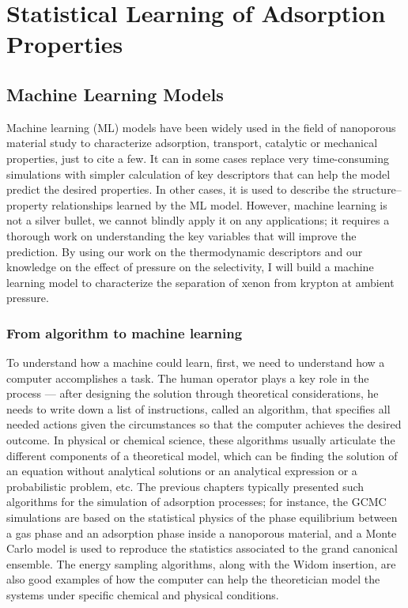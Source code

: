 \documentclass[main]{subfiles}
\begin{document}
\chapter{Statistical Learning of Adsorption Properties}
\vspace*{-1\baselineskip}


\section{Machine Learning Models}

Machine learning (ML) models have been widely used in the field of nanoporous material study to characterize adsorption, transport, catalytic or mechanical properties, just to cite a few. It can in some cases replace very time-consuming simulations with simpler calculation of key descriptors that can help the model predict the desired properties. In other cases, it is used to describe the structure--property relationships learned by the ML model. However, machine learning is not a silver bullet, we cannot blindly apply it on any applications; it requires a thorough work on understanding the key variables that will improve the prediction. By using our work on the thermodynamic descriptors and our knowledge on the effect of pressure on the selectivity, I will build a machine learning model to characterize the separation of xenon from krypton at ambient pressure.

\subsection{From algorithm to machine learning}

To understand how a machine could learn, first, we need to understand how a computer accomplishes a task. The human operator plays a key role in the process --- after designing the solution through theoretical considerations, he needs to write down a list of instructions, called an algorithm, that specifies all needed actions given the circumstances so that the computer achieves the desired outcome. In physical or chemical science, these algorithms usually articulate the different components of a theoretical model, which can be finding the solution of an equation without analytical solutions or an analytical expression or a probabilistic problem, etc. The previous chapters typically presented such algorithms for the simulation of adsorption processes; for instance, the GCMC simulations are based on the statistical physics of the phase equilibrium between a gas phase and an adsorption phase inside a nanoporous material, and a Monte Carlo model is used to reproduce the statistics associated to the grand canonical ensemble. The energy sampling algorithms, along with the Widom insertion, are also good examples of how the computer can help the theoretician model the systems under specific chemical and physical conditions. 
\end{document}
